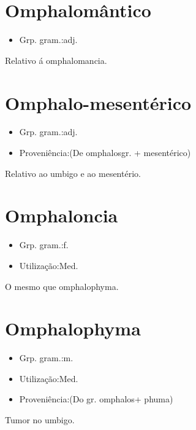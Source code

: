 \section{Omphalomântico}
\begin{itemize}
\item {Grp. gram.:adj.}
\end{itemize}
Relativo á omphalomancia.
\section{Omphalo-mesentérico}
\begin{itemize}
\item {Grp. gram.:adj.}
\end{itemize}
\begin{itemize}
\item {Proveniência:(De \textunderscore omphalos\textunderscore  gr. + \textunderscore mesentérico\textunderscore )}
\end{itemize}
Relativo ao umbigo e ao mesentério.
\section{Omphaloncia}
\begin{itemize}
\item {Grp. gram.:f.}
\end{itemize}
\begin{itemize}
\item {Utilização:Med.}
\end{itemize}
O mesmo que \textunderscore omphalophyma\textunderscore .
\section{Omphalophyma}
\begin{itemize}
\item {Grp. gram.:m.}
\end{itemize}
\begin{itemize}
\item {Utilização:Med.}
\end{itemize}
\begin{itemize}
\item {Proveniência:(Do gr. \textunderscore omphalos\textunderscore  + \textunderscore phuma\textunderscore )}
\end{itemize}
Tumor no umbigo.
